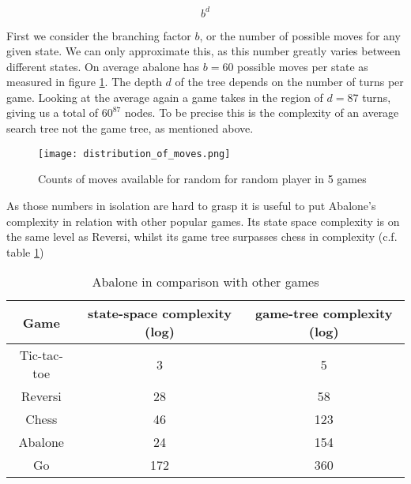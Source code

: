 $$
    b^d
$$

First we consider the branching factor $ b $, or the number of possible moves for any given state. We can only approximate this, as this number greatly varies between different states. On average abalone has $ b = 60 $ possible moves per state as measured in figure \ref{branching_factor}. The depth $ d $ of the tree depends on the number of turns per game. Looking at the average again a game takes in the region of $ d = 87 $ turns, giving us a total of $60^{87}$ nodes. To be precise this is the complexity of an average search tree not the game tree, as mentioned above. \cite{lemmens_constructing_2005}

\begin{figure}
    \centering
    \texttt{[image: distribution\_of\_moves.png]}
    \caption{Counts of moves available for random for random player in 5 games}
    \label{branching_factor}
\end{figure}

As those numbers in isolation are hard to grasp it is useful to put Abalone's complexity in relation with other popular games. Its state space complexity is on the same level as Reversi, whilst its game tree surpasses chess in complexity (c.f. table \ref{complexity_table})

\begin{table}
    \begin{center}
        \begin{tabular}{ | c | c | c | }
            \hline
            Game        & state-space complexity (log) & game-tree complexity (log) \\
            \hline
            Tic-tac-toe & 3                            & 5                          \\
            \hline
            Reversi     & 28                           & 58                         \\
            \hline
            Chess       & 46                           & 123                        \\
            \hline
            Abalone     & 24                           & 154                        \\
            \hline
            Go          & 172                          & 360                        \\
            \hline
        \end{tabular}
    \end{center}
    \caption{Abalone in comparison with other games \cite{chorus_implementing_2009}}
    \label{complexity_table}
\end{table}

